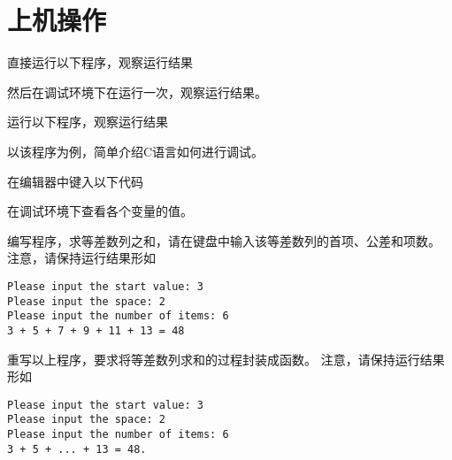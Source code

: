 \section{上机操作}


\begin{frame}[fragile]\ft{\secname}

  直接运行以下程序，观察运行结果
  
  \pause 
  然后在调试环境下在运行一次，观察运行结果。

\end{frame}

\begin{frame}[fragile]\ft{\secname}
  运行以下程序，观察运行结果
  

  \pause 
  以该程序为例，简单介绍C语言如何进行调试。
\end{frame}

\begin{frame}[fragile]\ft{\secname}
  在编辑器中键入以下代码
  
  在调试环境下查看各个变量的值。
\end{frame}


\begin{frame}[fragile]\ft{\secname}
  编写程序，求等差数列之和，请在键盘中输入该等差数列的首项、公差和项数。
  注意，请保持运行结果形如
  \begin{lstlisting}
Please input the start value: 3
Please input the space: 2
Please input the number of items: 6
3 + 5 + 7 + 9 + 11 + 13 = 48
  \end{lstlisting}

\end{frame}


\begin{frame}[fragile]\ft{\secname}
  重写以上程序，要求将等差数列求和的过程封装成函数。
  注意，请保持运行结果形如
  \begin{lstlisting}
Please input the start value: 3
Please input the space: 2
Please input the number of items: 6
3 + 5 + ... + 13 = 48.
\end{lstlisting}
\end{frame}
